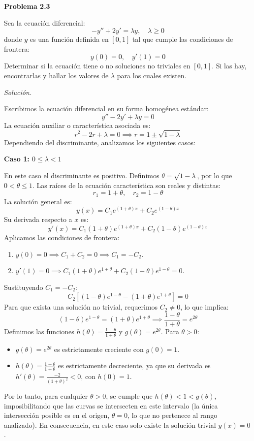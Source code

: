 \documentclass[12pt,letterpaper]{article}
\begin{document}
\bigskip

\textbf{Problema 2.3}

\medskip
Sea la ecuación diferencial:
\begin{equation}
  -y'' + 2y' = \lambda y, \quad \lambda \ge 0
\end{equation}
donde $y$ es una función definida en $[0, 1]$ tal que cumple las condiciones de frontera:
\[
  y(0) = 0, \quad y'(1) = 0
\]
Determinar si la ecuación tiene o no soluciones no triviales en $[0, 1]$. Si las hay, encontrarlas y hallar los valores de $\lambda$ para los cuales existen.

\medskip
\textit{Solución.}

Escribimos la ecuación diferencial en su forma homogénea estándar:
\[
  y'' - 2y' + \lambda y = 0
\]
La ecuación auxiliar o característica asociada es:
\[
  r^2 - 2r + \lambda = 0 \implies r = 1 \pm \sqrt{1 - \lambda}
\]
Dependiendo del discriminante, analizamos los siguientes casos:

\medskip
\textbf{Caso 1: $0 \le \lambda < 1$}

En este caso el discriminante es positivo. Definimos $\theta = \sqrt{1 - \lambda}$, por lo que $0 < \theta \le 1$. Las raíces de la ecuación característica son reales y distintas:
\[
  r_1 = 1 + \theta, \quad r_2 = 1 - \theta
\]
La solución general es:
\[
  y(x) = C_1 e^{(1+\theta)x} + C_2 e^{(1-\theta)x}
\]
Su derivada respecto a $x$ es:
\[
  y'(x) = C_1 (1+\theta) e^{(1+\theta)x} + C_2 (1-\theta) e^{(1-\theta)x}
\]
Aplicamos las condiciones de frontera:
\begin{enumerate}
  \item $y(0) = 0 \implies C_1 + C_2 = 0 \implies C_1 = -C_2$.
  \item $y'(1) = 0 \implies C_1 (1+\theta) e^{1+\theta} + C_2 (1-\theta) e^{1-\theta} = 0$.
\end{enumerate}
Sustituyendo $C_1 = -C_2$:
\[
  C_2 \left[ (1-\theta) e^{1-\theta} - (1+\theta) e^{1+\theta} \right] = 0
\]
Para que exista una solución no trivial, requerimos $C_2 \neq 0$, lo que implica:
\[
  (1-\theta) e^{1-\theta} = (1+\theta) e^{1+\theta} \implies \frac{1-\theta}{1+\theta} = e^{2\theta}
\]
Definimos las funciones $h(\theta) = \frac{1-\theta}{1+\theta}$ y $g(\theta) = e^{2\theta}$. Para $\theta > 0$:
\begin{itemize}
  \item $g(\theta) = e^{2\theta}$ es estrictamente creciente con $g(0) = 1$.
  \item $h(\theta) = \frac{1-\theta}{1+\theta}$ es estrictamente decreciente, ya que su derivada es $h'(\theta) = \frac{-2}{(1+\theta)^2} < 0$, con $h(0) = 1$.
\end{itemize}
Por lo tanto, para cualquier $\theta > 0$, se cumple que $h(\theta) < 1 < g(\theta)$, imposibilitando que las curvas se intersecten en este intervalo (la única intersección posible es en el origen, $\theta = 0$, lo que no pertenece al rango analizado).
En consecuencia, en este caso solo existe la solución trivial $y(x) = 0$.
\end{document}
